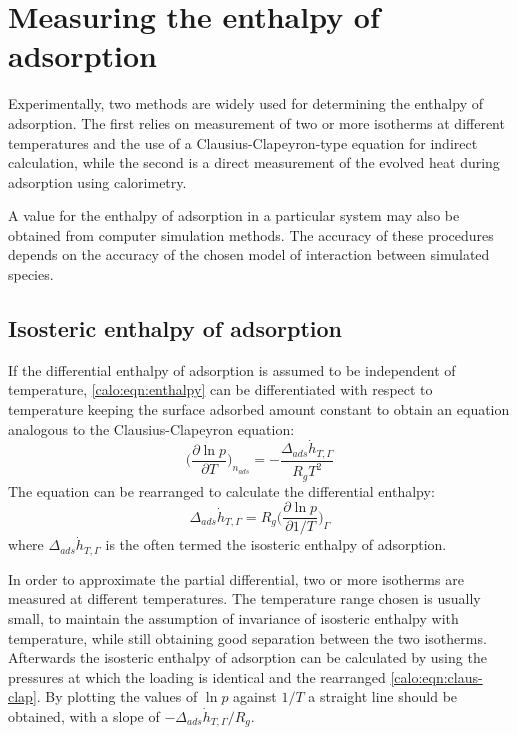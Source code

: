 
\section{Measuring the enthalpy of adsorption}

Experimentally, two methods are widely used for determining the
enthalpy of adsorption. The first relies on measurement of two
or more isotherms at different temperatures and the use of
a Clausius-Clapeyron-type equation for indirect calculation,
while the second is a direct measurement of the evolved heat
during adsorption using calorimetry.

A value for the enthalpy of adsorption in a particular system
may also be obtained from computer simulation methods.
The accuracy of these procedures depends on the accuracy of
the chosen model of interaction between simulated species.

\subsection{Isosteric enthalpy of adsorption}

If the differential enthalpy of adsorption is assumed to be independent
of temperature, \autoref{calo:eqn:enthalpy} can be differentiated
with respect to temperature keeping the surface adsorbed amount constant
to obtain an equation analogous to the Clausius-Clapeyron equation:
%
\begin{equation}
	\Big( \frac{\partial \ln p}{\partial T} \Big)_{n_{ads}} = -\frac{\Delta_{ads}\dot{h}_{T, \Gamma}}{R_g T^2}
\end{equation}
%
The equation can be rearranged to calculate the differential enthalpy:
%
\begin{equation}\label{calo:eqn:claus-clap}
	\Delta_{ads}\dot{h}_{T, \Gamma} = R_g \Big( \frac{\partial \ln p}{\partial 1 / T} \Big)_{\Gamma}
\end{equation}
%
where \(\Delta_{ads}\dot{h}_{T, \Gamma}\) is the often termed the
isosteric enthalpy of adsorption.

In order to approximate the partial differential, two or more
isotherms are measured at different temperatures. The temperature
range chosen is usually small, to maintain the assumption of invariance
of isosteric enthalpy with temperature, while still obtaining good 
separation between the two isotherms.
Afterwards the isosteric enthalpy of adsorption can be calculated
by using the pressures at which the loading is identical and the
rearranged \autoref{calo:eqn:claus-clap}. 
By plotting the values of \(\ln p\) against
\(1 / T\) a straight line should be obtained, with a slope
of \(- \Delta_{ads}\dot{h}_{T, \Gamma} / R_g\).

